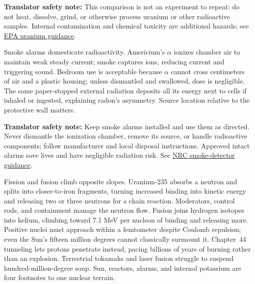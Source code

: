 \textbf{Translator safety note:} This comparison is not an experiment to repeat: do not heat, dissolve, grind, or otherwise process uranium or other radioactive samples. Internal contamination and chemical toxicity are additional hazards; see \href{https://www.epa.gov/radiation/radionuclide-basics-uranium}{EPA uranium guidance}.

Smoke alarms domesticate radioactivity. Americium's \(\alpha\) ionizes chamber air to maintain weak steady current; smoke captures ions, reducing current and triggering sound. Bedroom use is acceptable because \(\alpha\) cannot cross centimeters of air and a plastic housing; unless dismantled and swallowed, dose is negligible. The same paper-stopped external radiation deposits all its energy next to cells if inhaled or ingested, explaining radon's asymmetry. Source location relative to the protective wall matters.

\textbf{Translator safety note:} Keep smoke alarms installed and use them as directed. Never dismantle the ionization chamber, remove its source, or handle radioactive components; follow manufacturer and local disposal instructions. Approved intact alarms save lives and have negligible radiation risk. See \href{https://www.nrc.gov/reading-rm/doc-collections/fact-sheets/smoke-detectors}{NRC smoke-detector guidance}.

Fission and fusion climb opposite slopes. Uranium-235 absorbs a neutron and splits into closer-to-iron fragments, turning increased binding into kinetic energy and releasing two or three neutrons for a chain reaction. Moderators, control rods, and containment manage the neutron flow. Fusion joins hydrogen isotopes into helium, climbing toward 7.1 MeV per nucleon of binding and releasing more. Positive nuclei must approach within a femtometer despite Coulomb repulsion; even the Sun's fifteen million degrees cannot classically surmount it. Chapter~44 tunneling lets protons penetrate instead, pacing billions of years of burning rather than an explosion. Terrestrial tokamaks and laser fusion struggle to suspend hundred-million-degree soup. Sun, reactors, alarms, and internal potassium are four footnotes to one nuclear terrain.


